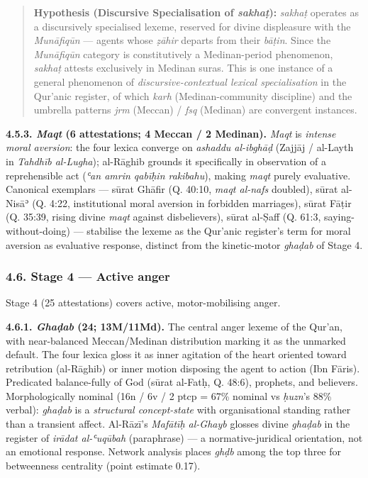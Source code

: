 \begin{quote}
\textbf{Hypothesis (Discursive Specialisation of \emph{sakhaṭ}):}
\emph{sakhaṭ} operates as a discursively specialised lexeme, reserved
for divine displeasure with the \emph{Munāfiqūn} --- agents whose
\emph{ẓāhir} departs from their \emph{bāṭin}. Since the \emph{Munāfiqūn}
category is constitutively a Medinan-period phenomenon, \emph{sakhaṭ}
attests exclusively in Medinan suras. This is one instance of a general
phenomenon of \emph{discursive-contextual lexical specialisation} in the
Qur'anic register, of which \emph{karh} (Medinan-community discipline)
and the umbrella patterns \emph{jrm} (Meccan) / \emph{fsq} (Medinan) are
convergent instances.
\end{quote}

\textbf{4.5.3. \emph{Maqt} (6 attestations; 4 Meccan / 2 Medinan).}
\emph{Maqt} is \emph{intense moral aversion}: the four lexica converge
on \emph{ashaddu al-ibghāḍ} (Zajjāj / al-Layth in \emph{Tahdhīb
al-Lugha}); al-Rāghib grounds it specifically in observation of a
reprehensible act (\emph{ʿan amrin qabīḥin rakibahu}), making
\emph{maqt} purely evaluative. Canonical exemplars --- sūrat Ghāfir (Q.
40:10, \emph{maqt al-nafs} doubled), sūrat al-Nisāʾ (Q. 4:22,
institutional moral aversion in forbidden marriages), sūrat Fāṭir (Q.
35:39, rising divine \emph{maqt} against disbelievers), sūrat al-Ṣaff
(Q. 61:3, saying-without-doing) --- stabilise the lexeme as the Qur'anic
register's term for moral aversion as evaluative response, distinct from
the kinetic-motor \emph{ghaḍab} of Stage 4.

\subsubsection{4.6. Stage 4 --- Active
anger}\label{stage-4-active-anger}

Stage 4 (25 attestations) covers active, motor-mobilising anger.

\textbf{4.6.1. \emph{Ghaḍab} (24; 13M/11Md).} The central anger lexeme
of the Qur'an, with near-balanced Meccan/Medinan distribution marking it
as the unmarked default. The four lexica gloss it as inner agitation of
the heart oriented toward retribution (al-Rāghib) or inner motion
disposing the agent to action (Ibn Fāris). Predicated balance-fully of
God (sūrat al-Fatḥ, Q. 48:6), prophets, and believers. Morphologically
nominal (16n / 6v / 2 ptcp = 67\% nominal vs \emph{ḥuzn}'s 88\% verbal):
\emph{ghaḍab} is a \emph{structural concept-state} with organisational
standing rather than a transient affect. Al-Rāzī's \emph{Mafātīḥ
al-Ghayb} glosses divine \emph{ghaḍab} in the register of \emph{irādat
al-ʿuqūbah} (paraphrase) --- a normative-juridical orientation, not an
emotional response. Network analysis places \emph{ghḍb} among the top
three for betweenness centrality (point estimate 0.17).

